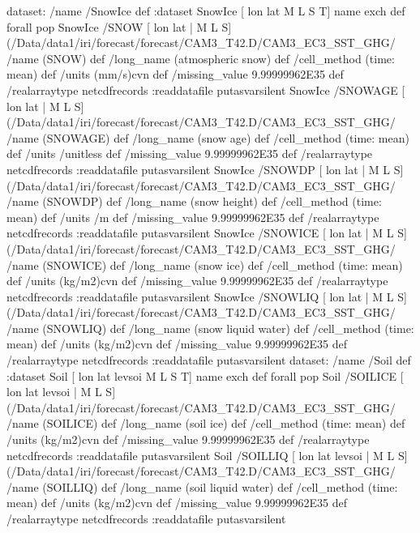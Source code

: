 \begin{ingrid}
dataset: /name /SnowIce def :dataset
SnowIce [ lon lat M L S T] {name exch def} forall pop
SnowIce /SNOW{
[ lon lat | M L S] (/Data/data1/iri/forecast/forecast/CAM3_T42.D/CAM3_EC3_SST_GHG/%
/name (SNOW) def
 /long_name (atmospheric snow) def
 /cell_method (time: mean) def
 /units (mm/s)cvn def
 /missing_value 9.99999962E35 def
 /realarraytype netcdfrecords :readdatafile
}putasvarsilent
SnowIce /SNOWAGE{
[ lon lat | M L S] (/Data/data1/iri/forecast/forecast/CAM3_T42.D/CAM3_EC3_SST_GHG/%
/name (SNOWAGE) def
 /long_name (snow age) def
 /cell_method (time: mean) def
 /units /unitless def
 /missing_value 9.99999962E35 def
 /realarraytype netcdfrecords :readdatafile
}putasvarsilent
SnowIce /SNOWDP{
[ lon lat | M L S] (/Data/data1/iri/forecast/forecast/CAM3_T42.D/CAM3_EC3_SST_GHG/%
/name (SNOWDP) def
 /long_name (snow height) def
 /cell_method (time: mean) def
 /units /m def
 /missing_value 9.99999962E35 def
 /realarraytype netcdfrecords :readdatafile
}putasvarsilent
SnowIce /SNOWICE{
[ lon lat | M L S] (/Data/data1/iri/forecast/forecast/CAM3_T42.D/CAM3_EC3_SST_GHG/%
/name (SNOWICE) def
 /long_name (snow ice) def
 /cell_method (time: mean) def
 /units (kg/m2)cvn def
 /missing_value 9.99999962E35 def
 /realarraytype netcdfrecords :readdatafile
}putasvarsilent
SnowIce /SNOWLIQ{
[ lon lat | M L S] (/Data/data1/iri/forecast/forecast/CAM3_T42.D/CAM3_EC3_SST_GHG/%
/name (SNOWLIQ) def
 /long_name (snow liquid water) def
 /cell_method (time: mean) def
 /units (kg/m2)cvn def
 /missing_value 9.99999962E35 def
 /realarraytype netcdfrecords :readdatafile
}putasvarsilent
dataset: /name /Soil def :dataset
Soil [ lon lat levsoi M L S T] {name exch def} forall pop
Soil /SOILICE{
[ lon lat levsoi | M L S] (/Data/data1/iri/forecast/forecast/CAM3_T42.D/CAM3_EC3_SST_GHG/%
/name (SOILICE) def
 /long_name (soil ice) def
 /cell_method (time: mean) def
 /units (kg/m2)cvn def
 /missing_value 9.99999962E35 def
 /realarraytype netcdfrecords :readdatafile
}putasvarsilent
Soil /SOILLIQ{
[ lon lat levsoi | M L S] (/Data/data1/iri/forecast/forecast/CAM3_T42.D/CAM3_EC3_SST_GHG/%
/name (SOILLIQ) def
 /long_name (soil liquid water) def
 /cell_method (time: mean) def
 /units (kg/m2)cvn def
 /missing_value 9.99999962E35 def
 /realarraytype netcdfrecords :readdatafile
}putasvarsilent


\end{ingrid}
